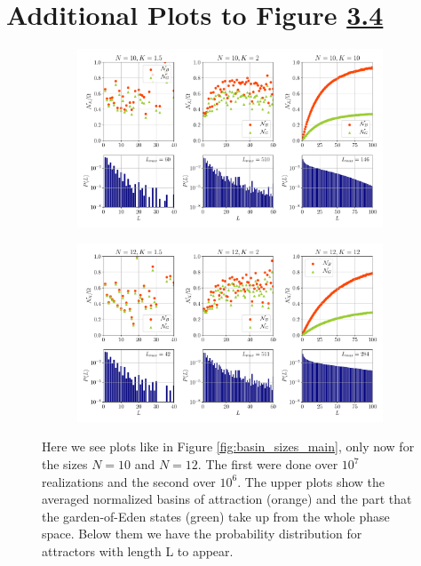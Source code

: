 \section{Additional Plots to Figure \hyperref[fig:basin_sizes_main]{3.4}}
\begin{figure}[h!]
\begin{subfigure}{\textwidth}
\includegraphics[width=\textwidth]{Plots/basin_sizes_N10}
\end{subfigure}
\begin{subfigure}{\textwidth}
\includegraphics[width=\textwidth]{Plots/basin_sizes_N12}
\end{subfigure}
	\caption{Here we see plots like in Figure \ref{fig:basin_sizes_main}, only now for the sizes $N=10$ and $N=12$. The first were done over $10^7$ realizations and the second over $10^6$. The upper plots show the averaged normalized basins of attraction (orange) and the part that the garden-of-Eden states (green) take up from the whole phase space. Below them we have the probability distribution for attractors with length L to appear.}
	\label{fig:basin_sizes_main_additional_sizes}
\end{figure}

